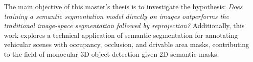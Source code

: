The main objective of this master's thesis is to investigate the hypothesis: \textit{Does training a semantic segmentation model directly on  images outperforms the traditional image-space segmentation followed by  reprojection?} Additionally, this work explores a technical application of  semantic segmentation for annotating vehicular scenes with occupancy, occlusion, and drivable area masks, contributing to the field of monocular 3D object detection given 2D semantic masks.








